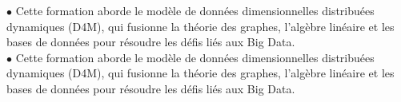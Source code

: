 \documentclass[theme]{cv_einstein}
\begin{document}
\begin{paracol}{2}
\begin{leftcolumn}
{}
        \end{leftcolumn}
        \begin{rightcolumn}\noindent \small
            \hspace{-2.4pt}
            {$\bullet$ Cette formation aborde le modèle de données dimensionnelles distribuées dynamiques (D4M), qui fusionne la théorie des graphes, l'algèbre linéaire et les\:\:\:\:\:\:\:\:\:\:\:\:\:\:\:\:\:\:\:\:\: bases de données pour résoudre les défis liés aux Big Data.}
             \vspace{0.005cm}\\
            {$\bullet$ Cette formation aborde le modèle de données dimensionnelles distribuées dynamiques (D4M), qui fusionne la théorie des graphes, l'algèbre linéaire et les\:\:\:\:\:\:\:\:\:\:\:\:\:\:\:\:\:\:\:\:\: bases de données pour résoudre les défis liés aux Big Data.}
            \end{rightcolumn}
            \begin{rightcolumn}\noindent \small
        \end{rightcolumn}
        \vspace{0em}
    \end{paracol}
\end{document}
